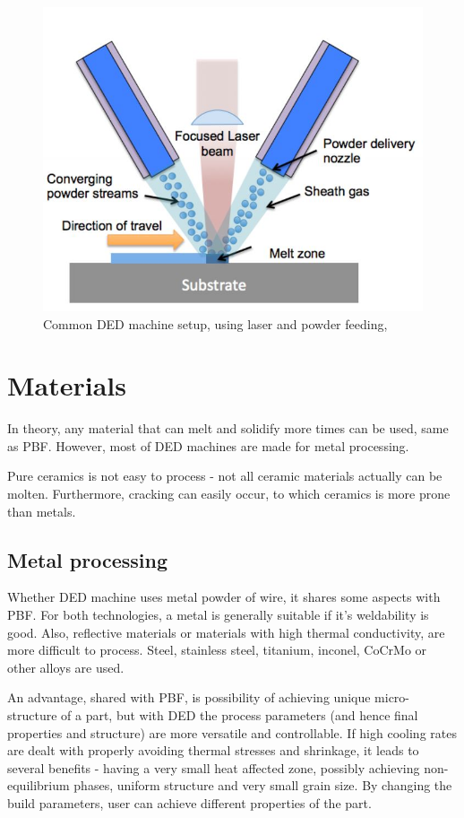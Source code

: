 \documentclass[a4paper, twoside, 11pt]{report}
\begin{document}
\begin{figure}[h]
	\centering
	\includegraphics[scale=0.7]{DED3dprinting}
	\caption{Common DED machine setup, using laser and powder feeding, \cite{3dprinting}}
\end{figure}

\section{Materials}

In theory, any material that can melt and solidify more times can be used, same as PBF. However, most of DED machines are made for metal processing.

	Pure ceramics is not easy to process - not all ceramic materials actually can be molten. Furthermore, cracking can easily occur, to which ceramics is more prone than metals.

\subsection{Metal processing}
Whether DED machine uses metal powder of wire, it shares some aspects with PBF. For both technologies, a metal is generally suitable if it's weldability is good. Also, reflective materials or materials with high thermal conductivity, are more difficult to process. Steel, stainless steel, titanium, inconel, CoCrMo or other alloys are used.

	An advantage, shared with PBF, is possibility of achieving unique micro-structure of a part, but with DED the process parameters (and hence final properties and structure) are more versatile and controllable. If high cooling rates are dealt with properly avoiding thermal stresses and shrinkage, it leads to several benefits - having a very small heat affected zone, possibly achieving non-equilibrium phases, uniform structure and very small grain size. By changing the build parameters, user can achieve different properties of the part.
\end{document}
